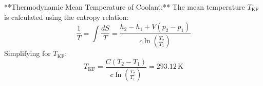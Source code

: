 **Thermodynamic Mean Temperature of Coolant:**  
The mean temperature \( T_{\text{KF}} \) is calculated using the entropy relation:  
\[
\frac{1}{T} = \int \frac{dS}{T} = \frac{h_2 - h_1 + V(p_2 - p_1)}{c \ln \left( \frac{T_2}{T_1} \right)}
\]  
Simplifying for \( T_{\text{KF}} \):  
\[
T_{\text{KF}} = \frac{C \left( T_2 - T_1 \right)}{c \ln \left( \frac{T_2}{T_1} \right)} = 293.12 \, \text{K}
\]
